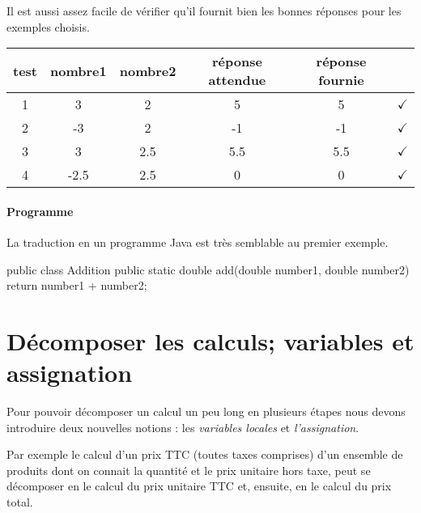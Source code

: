 \begin{Emphase}
				Il est aussi assez facile de vérifier qu’il fournit
				bien les bonnes réponses pour les exemples choisis.				


				\begin{center}
				\begin{tabular}{|c|cccc|c|}
				\hline
				\rowcolor{black!40}
				test \no & nombre1 & nombre2 & réponse attendue 
				  & réponse fournie & {} \\
				\hline 
				1 & 3    & 2   & 5   & 5   
					& {\color{ForestGreen}$\checkmark$} \\\hline
				2 & -3   & 2   & -1  & -1  
					& {\color{ForestGreen}$\checkmark$} \\\hline
				3 & 3    & 2.5 & 5.5 & 5.5 
					& {\color{ForestGreen}$\checkmark$} \\\hline
				4 & -2.5 & 2.5 & 0   & 0   
					& {\color{ForestGreen}$\checkmark$} \\\hline
				\end{tabular}
				\end{center}				

				\paragraph{Programme}

				La traduction en un programme Java est très semblable au 
				premier exemple. 

				\begin{java}
public class Addition{
	public static double add(double number1, double number2){
		return number1 + number2;
	}
}			
				\end{java}

			\end{Emphase}
		
	
	
	
	\section{Décomposer les calculs; variables et assignation}
	
		Pour pouvoir décomposer un calcul un peu long en plusieurs étapes
		nous devons introduire deux nouvelles notions :
		les \emph{variables locales} et \emph{l’assignation}.

		Par exemple le calcul d'un prix TTC (toutes taxes comprises) d'un
		ensemble de produits dont on connait la quantité et le prix unitaire
		hors taxe, peut se décomposer en le calcul du prix unitaire TTC et,
		ensuite, en le calcul du prix total. 

